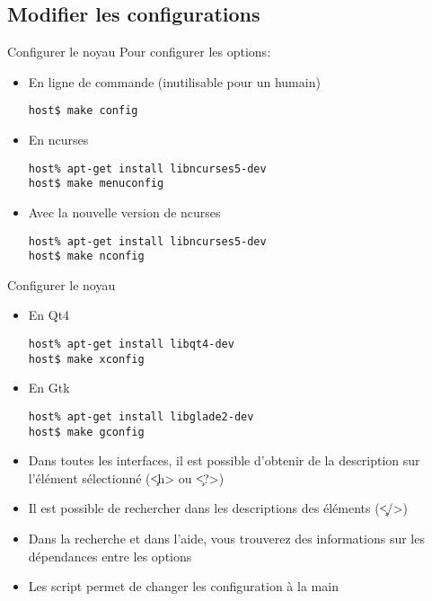 \subsection{Modifier les configurations}
\begin{frame}[fragile=singleslide]{Configurer le noyau}
 Pour configurer les options:
 \begin{itemize}    
 \item En ligne de commande (inutilisable pour un humain)
   \begin{lstlisting}
host$ make config
   \end{lstlisting} %
 \item En ncurses
   \begin{lstlisting}
host% apt-get install libncurses5-dev
host$ make menuconfig
   \end{lstlisting} %
 \item Avec la nouvelle version de ncurses 
   \begin{lstlisting}
host% apt-get install libncurses5-dev
host$ make nconfig
   \end{lstlisting} %
\end{itemize} 
\end{frame} 

\begin{frame}[fragile=singleslide]{Configurer le noyau}
\begin{itemize} 
 \item En Qt4
   \begin{lstlisting}
host% apt-get install libqt4-dev
host$ make xconfig
   \end{lstlisting} %
 \item En Gtk
   \begin{lstlisting}
host% apt-get install libglade2-dev
host$ make gconfig
   \end{lstlisting} %
 \item Dans  toutes les  interfaces, il est  possible d'obtenir  de la
   description sur l'élément sélectionné (\c{<h>} ou \c{<?>})
 \item  Il  est  possible  de  rechercher dans  les  descriptions  des
   éléments (\c{</>})
 \item  Dans   la  recherche  et  dans  l'aide,   vous  trouverez  des
   informations sur les dépendances entre les options
 \item   Les  script     permet  de   changer  les
   configuration à la main
 \end{itemize}
\end{frame}


